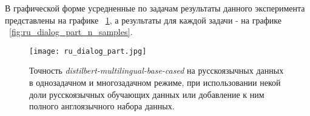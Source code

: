 В графической форме усредненные по задачам результаты данного эксперимента представлены на графике ~\ref{fig:ru_dialog_part}, а результаты для каждой задачи - на графике ~\ref{fig:ru_dialog_part_n_samples}. 

\begin{figure}[ht]
    \texttt{[image: ru\_dialog\_part.jpg]}
  \caption{Точность \textit{distilbert-multilingual-base-cased} на русскоязычных данных в однозадачном и многозадачном режиме, при использовании некой доли русскоязычных обучающих данных или добавление к ним полного англоязычного набора данных.}\label{fig:ru_dialog_part}
\end{figure}

\label{fig:thresholds_acc}
